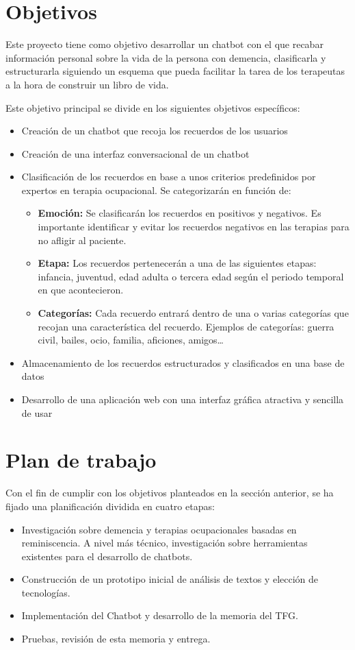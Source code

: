 \section{Objetivos}

Este proyecto tiene como objetivo desarrollar un chatbot con el que recabar información personal sobre la vida de la persona con demencia, clasificarla y estructurarla siguiendo un esquema que pueda facilitar la tarea de los terapeutas a la hora de construir un libro de vida. 

Este objetivo principal se divide en los siguientes objetivos específicos:
\begin{itemize}
	\item Creación de un chatbot que recoja los recuerdos de los usuarios
	\item Creación de una interfaz conversacional de un chatbot
	\item Clasificación de los recuerdos en base a unos criterios predefinidos por expertos en terapia ocupacional. Se categorizarán en función de: 
	\begin{itemize}
		\item \textbf{Emoción:} Se clasificarán los recuerdos en positivos y negativos. Es importante identificar y evitar los recuerdos negativos en las terapias para no afligir al paciente. 
		\item \textbf{Etapa:} Los recuerdos pertenecerán a una de las siguientes etapas: infancia, juventud, edad adulta o tercera edad según el periodo temporal en que acontecieron.
		\item \textbf{Categorías:} Cada recuerdo entrará dentro de una o varias categorías que recojan una característica del recuerdo. Ejemplos de categorías: guerra civil, bailes, ocio, familia, aficiones, amigos…
	\end{itemize}
	\item Almacenamiento de los recuerdos estructurados y clasificados en una base de datos 
	\item Desarrollo de una aplicación web con una interfaz gráfica atractiva y sencilla de usar
\end{itemize}


\section{Plan de trabajo}

Con el fin de cumplir con los objetivos planteados en la sección anterior, se ha fijado una planificación dividida en cuatro etapas:
\begin{itemize}
	\item Investigación sobre demencia y terapias ocupacionales basadas en reminiscencia. A nivel más técnico, investigación sobre herramientas existentes para el desarrollo de chatbots.
	\item Construcción de un prototipo inicial de análisis de textos y elección de tecnologías.
	\item Implementación del Chatbot y desarrollo de la memoria del TFG.
	\item Pruebas, revisión de esta memoria y entrega.
\end{itemize}

